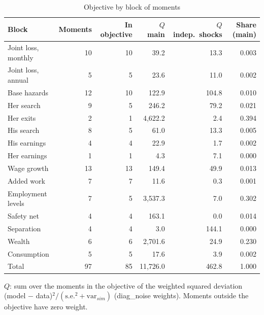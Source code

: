 \begin{table}[htbp]\centering\small
\caption{Objective by block of moments}\label{tab:q_by_block}
\begin{tabular}{lrrrrr}
\toprule
Block & Moments & In objective & $Q$ main & $Q$ indep.\ shocks & Share (main) \\
\midrule
Joint loss, monthly & 10 & 10 & 39.2 & 13.3 & 0.003 \\
Joint loss, annual & 5 & 5 & 23.6 & 11.0 & 0.002 \\
Base hazards & 12 & 10 & 122.9 & 104.8 & 0.010 \\
Her search & 9 & 5 & 246.2 & 79.2 & 0.021 \\
Her exits & 2 & 1 & 4,622.2 & 2.4 & 0.394 \\
His search & 8 & 5 & 61.0 & 13.3 & 0.005 \\
His earnings & 4 & 4 & 22.9 & 1.7 & 0.002 \\
Her earnings & 1 & 1 & 4.3 & 7.1 & 0.000 \\
Wage growth & 13 & 13 & 149.4 & 49.9 & 0.013 \\
Added work & 7 & 7 & 11.6 & 0.3 & 0.001 \\
Employment levels & 7 & 5 & 3,537.3 & 7.0 & 0.302 \\
Safety net & 4 & 4 & 163.1 & 0.0 & 0.014 \\
Separation & 4 & 4 & 3.0 & 144.1 & 0.000 \\
Wealth & 6 & 6 & 2,701.6 & 24.9 & 0.230 \\
Consumption & 5 & 5 & 17.6 & 3.9 & 0.002 \\
\midrule
Total & 97 & 85 & 11,726.0 & 462.8 & 1.000 \\
\bottomrule
\end{tabular}
\begin{minipage}{0.95\textwidth}\footnotesize $Q$: sum over the moments in the objective of the weighted squared deviation (model $-$ data)$^2 / (\mathrm{s.e.}^2 + \mathrm{var}_{sim})$ (diag\_noise weights). Moments outside the objective have zero weight.\end{minipage}
\end{table}
